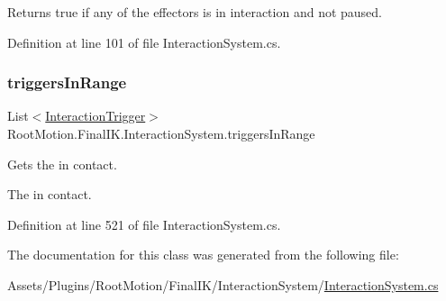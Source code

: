 Returns true if any of the effectors is in interaction and not paused. 



Definition at line 101 of file Interaction\+System.\+cs.

\mbox{\label{class_root_motion_1_1_final_i_k_1_1_interaction_system_ae42cf567290135b38026f338f5ae17e9}} 
\subsubsection{\texorpdfstring{triggers\+In\+Range}{triggersInRange}}
{\footnotesize\ttfamily List$<$\mbox{\hyperlink{class_root_motion_1_1_final_i_k_1_1_interaction_trigger}{Interaction\+Trigger}}$>$ Root\+Motion.\+Final\+I\+K.\+Interaction\+System.\+triggers\+In\+Range\hspace{0.3cm}{\ttfamily [get]}}



Gets the in contact. 

The in contact.

Definition at line 521 of file Interaction\+System.\+cs.



The documentation for this class was generated from the following file\+:\begin{DoxyCompactItemize}
\item 
Assets/\+Plugins/\+Root\+Motion/\+Final\+I\+K/\+Interaction\+System/\mbox{\hyperlink{_interaction_system_8cs}{Interaction\+System.\+cs}}\end{DoxyCompactItemize}
